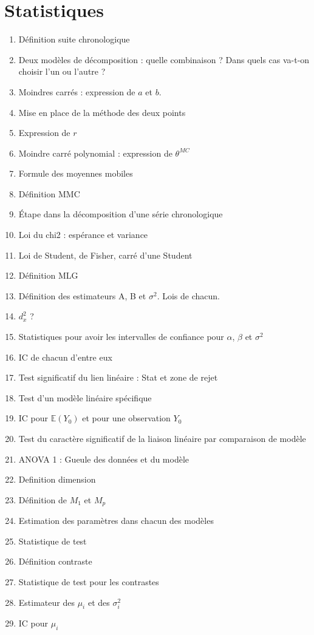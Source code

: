 \documentclass{article}
\begin{document}
\part{Statistiques}
\begin{enumerate}
\item Définition suite chronologique
\item Deux modèles de décomposition : quelle combinaison ? Dans quels cas va-t-on choisir l'un ou l'autre ?
\item Moindres carrés : expression de $a$ et $b$. 
\item Mise en place de la méthode des deux points
\item Expression de $r$
\item Moindre carré polynomial : expression de $\theta^{MC}$
\item Formule des moyennes mobiles
\item Définition MMC
\item Étape dans la décomposition d'une série chronologique
\item Loi du chi2 : espérance et variance
\item Loi de Student, de Fisher, carré d'une Student
\item Définition MLG
\item Définition des estimateurs A, B et $\sigma^2$. Lois de chacun.
\item $d_x^2$ ?
\item Statistiques pour avoir les intervalles de confiance pour $\alpha$, $\beta$ et $\sigma^2$
\item IC de chacun d'entre eux
\item Test significatif du lien linéaire : Stat et zone de rejet
\item Test d'un modèle linéaire spécifique
\item IC pour $\mathbb{E}(Y_0)$ et pour une observation $Y_0$
\item Test du caractère significatif de la liaison linéaire par comparaison de modèle
\item ANOVA 1 : Gueule des données et du modèle
\item Definition dimension
\item Définition de $M_1$ et $M_p$
\item Estimation des paramètres dans chacun des modèles
\item Statistique de test
\item Définition contraste
\item Statistique de test pour les contrastes
\item Estimateur des $\mu_i$ et des $\sigma_i^2$
\item IC pour $\mu_i$
\end{enumerate}
\end{document}
